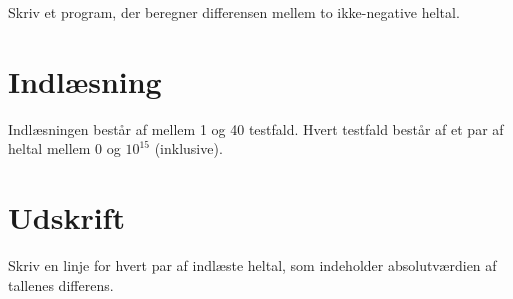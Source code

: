 
Skriv et program, der beregner differensen mellem to ikke-negative heltal.

\section*{Indlæsning}

Indlæsningen består af mellem 1 og 40 testfald.
Hvert testfald består af et par af heltal mellem $0$ og $10^{15}$ (inklusive).

\section*{Udskrift}

Skriv en linje for hvert par af indlæste heltal, som indeholder absolutværdien af tallenes differens.
